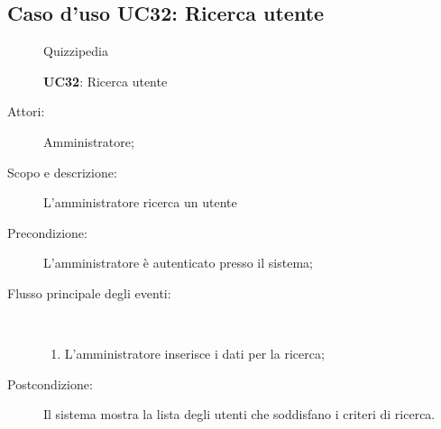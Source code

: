 \subsection{Caso d'uso UC32: Ricerca utente}
	\begin{figure}[H]
		\centering
		\begin{resizedtikzpicture}{\textwidth}
		\begin{umlsystem}[x=0, fill=lightgray!20]{Quizzipedia}
		\end{umlsystem}
		\end{resizedtikzpicture}
		\caption{\textbf{UC32}: Ricerca utente}
		\label{UC32}
	\end{figure}
\begin{description}
\item[Attori:] Amministratore;
\item[Scopo e descrizione:] L'amministratore ricerca un utente
      \item[Precondizione:] L'amministratore è autenticato presso il sistema;

        \item[Flusso principale degli eventi:] \ 
 \begin{enumerate}
          \item L'amministratore inserisce i dati per la ricerca;

      \end{enumerate}
    \item[Postcondizione:] Il sistema mostra la lista degli utenti che soddisfano i criteri di ricerca.
  \end{description}
\hypertarget{UC33}{}
